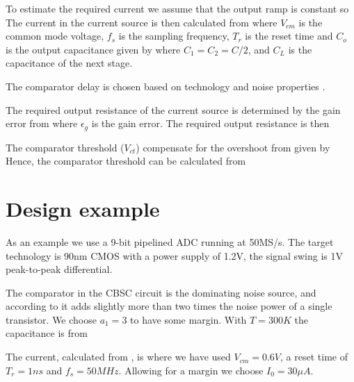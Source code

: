 To estimate the required current we assume that the output ramp is
constant so
The current in the current source is then calculated from
where $V_{cm}$ is the common mode voltage, $f_s$ is the sampling
frequency, $T_r$ is the reset time and $C_o$ is the output capacitance
given by
where $C_1 = C_2 = C/2$, and $C_L$ is the capacitance of the next
stage. 

The comparator delay is chosen based on technology and noise
properties \cite{fiorenza06}.

The required output resistance of the current source is determined by
the gain error from 
where $\epsilon_g$ is the gain error.  The required output resistance
is then

The comparator threshold ($V_{ct}$) compensate for the overshoot from
 given by
Hence, the comparator threshold can be calculated from


\section{Design example}\label{cdessc:example}
As an example we use a  9-bit pipelined
ADC running at 50MS/s. The target technology is 90nm CMOS  with a power
supply of 1.2V, the signal swing is 1V peak-to-peak
differential. 

The comparator in the CBSC
circuit is the dominating noise source, and according to
\cite{fiorenza06} it adds slightly more than two times the noise power
of a single transistor. We choose $a_1 = 3$ to have some margin. With
$T=300K$ the capacitance is from 

The current, calculated from , is 
where we have used $V_{cm} = 0.6V$, a reset time of $T_r = 1ns$ and
$f_s = 50MHz$.  Allowing for a margin we choose $I_0 = 30 \mu A$. 


